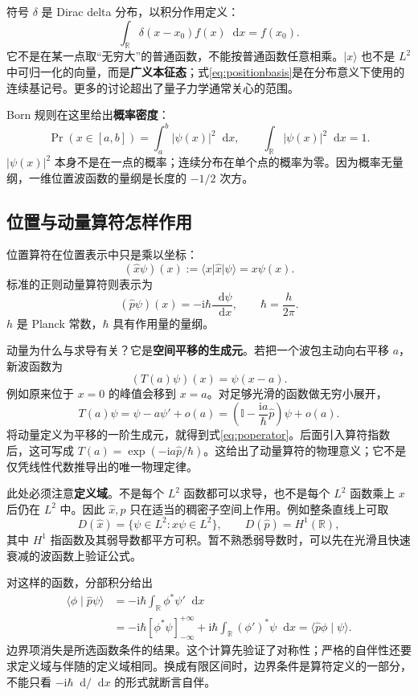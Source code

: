 \documentclass[a4paper,11pt]{article}
\numberwithin{equation}{section}
\newcommand{\ii}{\mathrm{i}}
\newcommand{\dd}{\mathop{}\!\mathrm{d}}
\newcommand{\I}{\mathbb I}
\newcommand{\ket}[1]{\lvert #1\rangle}
\newcommand{\braket}[2]{\langle #1\mid #2\rangle}
\newcommand{\mel}[3]{\langle #1\rvert #2\lvert #3\rangle}
\newcommand{\abs}[1]{\lvert #1\rvert}
\begin{document}
符号 $\delta$ 是 Dirac delta 分布，以积分作用定义：
\[
  \int_{\mathbb R}\delta(x-x_0)f(x)\dd x=f(x_0).
\]
它不是在某一点取“无穷大”的普通函数，不能按普通函数任意相乘。$\ket{x}$ 也不是 $L^2$ 中可归一化的向量，而是\textbf{广义本征态}；式\eqref{eq:positionbasis}是在分布意义下使用的连续基记号。更多的讨论超出了量子力学通常关心的范围。

Born 规则在这里给出\textbf{概率密度}：
\begin{equation}\label{eq:positionBorn}
  \Pr(x\in[a,b])=\int_a^b\abs{\psi(x)}^2\dd x,
  \qquad \int_{\mathbb R}\abs{\psi(x)}^2\dd x=1.
\end{equation}
$\abs{\psi(x)}^2$ 本身不是在一点的概率；连续分布在单个点的概率为零。因为概率无量纲，一维位置波函数的量纲是长度的 $-1/2$ 次方。

\subsection{位置与动量算符怎样作用}
位置算符在位置表示中只是乘以坐标：
\begin{equation}
  (\hat x\psi)(x):=\mel{x}{\hat x}{\psi}=x\psi(x).
\end{equation}
标准的正则动量算符则表示为
\begin{equation}\label{eq:poperator}
  (\hat p\psi)(x)=-\ii\hbar\frac{\dd\psi}{\dd x},
  \qquad \hbar=\frac{h}{2\pi}.
\end{equation}
$h$ 是 Planck 常数，$\hbar$ 具有作用量的量纲。

动量为什么与求导有关？它是\textbf{空间平移的生成元}。若把一个波包主动向右平移 $a$，新波函数为
\[
  (T(a)\psi)(x)=\psi(x-a).
\]
例如原来位于 $x=0$ 的峰值会移到 $x=a$。对足够光滑的函数做无穷小展开，
\begin{equation}
  T(a)\psi=\psi-a\psi'+o(a)
  =\left(\I-\frac{\ii a}{\hbar}\hat p\right)\psi+o(a).
\end{equation}
将动量定义为平移的一阶生成元，就得到式\eqref{eq:poperator}。后面引入算符指数后，这可写成 $T(a)=\exp(-\ii a\hat p/\hbar)$。这给出了动量算符的物理意义；它不是仅凭线性代数推导出的唯一物理定律。

此处必须注意\textbf{定义域}。不是每个 $L^2$ 函数都可以求导，也不是每个 $L^2$ 函数乘上 $x$ 后仍在 $L^2$ 中。因此 $\hat x,\hat p$ 只在适当的稠密子空间上作用。例如整条直线上可取
\[
  D(\hat x)=\{\psi\in L^2:x\psi\in L^2\},\qquad
  D(\hat p)=H^1(\mathbb R),
\]
其中 $H^1$ 指函数及其弱导数都平方可积。暂不熟悉弱导数时，可以先在光滑且快速衰减的波函数上验证公式。

对这样的函数，分部积分给出
\begin{align}
  \braket{\phi}{\hat p\psi}
  &=-\ii\hbar\int_{\mathbb R}\phi^*\psi'\dd x\\
  &=-\ii\hbar[\phi^*\psi]_{-\infty}^{+\infty}
    +\ii\hbar\int_{\mathbb R}(\phi')^*\psi\dd x
  =\braket{\hat p\phi}{\psi}.
\end{align}
边界项消失是所选函数条件的结果。这个计算先验证了对称性；严格的自伴性还要求定义域与伴随的定义域相同。换成有限区间时，边界条件是算符定义的一部分，不能只看 $-\ii\hbar\dd/\dd x$ 的形式就断言自伴。
\end{document}
